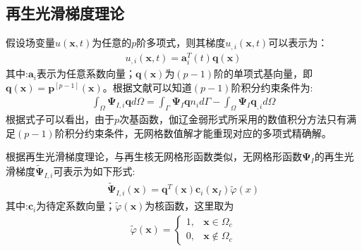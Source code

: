 \documentclass[11pt,a4paper]{article}
\begin{document}
\begin{dispalmath}
\begin{dispalymath}
\section{再生光滑梯度理论}
假设场变量$u(\pmb x,t)$为任意的$p$阶多项式，则其梯度$u_{,i}(\pmb x,t)$可以表示为：
\begin{displaymath}
\begin{equation}
\begin{split}
    u_{,i}(\pmb x,t)=\pmb a_i^T(t)\pmb q(\pmb x)
\end{split}
\end{equation}
\end{displaymath}
其中:$\pmb a_i$表示为任意系数向量；$\pmb q(\pmb x)$为$(p-1)$阶的单项式基向量，即$\pmb q(\pmb x)=\pmb p^{[p-1]}(\pmb x)$。根据文献可以知道$(p-1)$阶积分约束条件为:
\begin{displaymath}
\begin{equation}
\begin{split}
    \int_{\Omega}\pmb \Psi_{I,i}\pmb qd\Omega=\int_{\Gamma}\pmb \Psi_I \pmb qn_id\Gamma-\int_{\Omega}\pmb \Psi_I\pmb q_{,i}d\Omega
\end{split}
\end{equation}
\end{displaymath}
根据式子可以看出，由于$p$次基函数，伽辽金弱形式所采用的数值积分方法只有满足$(p-1)$阶积分约束条件，无网格数值解才能重现对应的多项式精确解。\par
根据再生光滑梯度理论，与再生核无网格形函数类似，无网格形函数$\pmb \Psi_I$的再生光滑梯度$\tilde{\pmb\Psi}_{I,i}$可表示为如下形式:
\begin{displaymath}
\begin{equation}
\begin{split}
\tilde{\pmb \Psi}_{I,i}(\pmb x)=\pmb q^T(\pmb x)\pmb c_i(\pmb x_I)\tilde{\varphi}(x)
\end{split}
\end{equation}
\end{displaymath}
其中:$\pmb c_i$为待定系数向量；$\tilde{\varphi}(\pmb x)$为核函数，这里取为
\begin{displaymath}
\begin{equation}
\begin{split}
    \tilde{\varphi}(\pmb x)=\begin{cases}
        1,&\pmb x\in\Omega_c\\
        0,&\pmb x\notin\Omega_c\end{cases}
\end{split}
\end{equation}

\end{displaymath}
\end{dispalymath}
\end{dispalmath}
\end{document}
